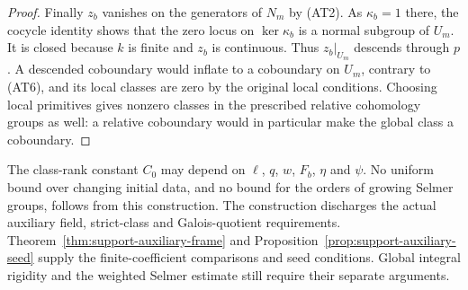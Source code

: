 \begin{proof}
Finally $z_b$ vanishes on the generators of $N_m$ by (AT2).
As $\kappa_b=1$ there, the cocycle identity shows that the zero locus
on $\ker\kappa_b$ is a normal subgroup of $U_m$.  It is
closed because $k$ is finite and $z_b$ is continuous.
Thus $z_b|_{U_m}$ descends through $p$.  A descended
coboundary would inflate to a coboundary on $U_m$,
contrary to (AT6), and its local classes are zero by
the original local conditions.  Choosing local primitives
gives nonzero classes in the prescribed relative
cohomology groups as well: a relative coboundary would
in particular make the global class a coboundary.
\end{proof}

The class-rank constant $C_0$ may depend on $\ell$, $q$, $w$,
$F_b$, $\eta$ and $\psi$.  No uniform bound over changing
initial data, and no bound for the orders of growing Selmer
groups, follows from this construction.  The construction
discharges the actual auxiliary field, strict-class and
Galois-quotient requirements.
Theorem~\ref{thm:support-auxiliary-frame} and
Proposition~\ref{prop:support-auxiliary-seed} supply the
finite-coefficient comparisons and seed conditions.
Global integral rigidity and the weighted Selmer estimate
still require their separate arguments.
